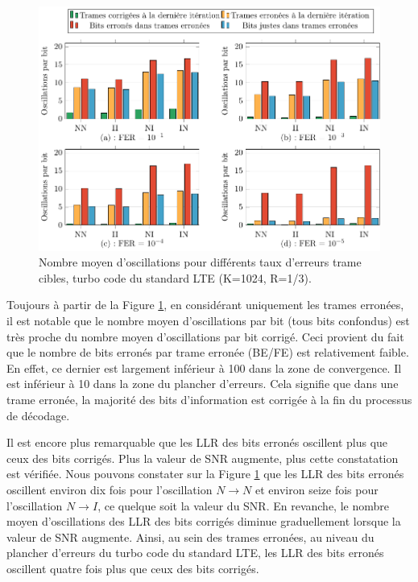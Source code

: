 \begin{figure}[tb]
	\begin{center}
	\includegraphics[width=.9\textwidth]{main/ch2_fig/tikz/m_lte.pdf}
	\caption{Nombre moyen d'oscillations pour différents taux d'erreurs trame cibles, turbo code du standard LTE (K=1024, R=1/3). \label{ch2:fig:meanlte}}
	\end{center}
\end{figure}

Toujours à partir de la Figure \ref{ch2:fig:meanlte}, en considérant uniquement les trames erronées, il est notable que le nombre moyen 
d’oscillations par bit (tous bits confondus) est très proche du nombre moyen d’oscillations par bit corrigé. Ceci 
provient du fait que le nombre de bits erronés par trame erronée (BE/FE) est relativement faible. En effet, ce dernier 
est largement inférieur à 100 dans la zone de convergence. Il est inférieur à 10 dans la zone du plancher d'erreurs. Cela
signifie que dans une trame erronée, la majorité des bits d'information est corrigée à la fin du processus de décodage. 

Il est encore plus remarquable que les LLR des bits erronés oscillent plus que ceux des bits corrigés. Plus la valeur de SNR augmente, 
plus cette constatation est vérifiée. Nous pouvons constater sur la Figure \ref{ch2:fig:meanlte} que les LLR des bits erronés 
oscillent environ dix fois pour l'oscillation $N\rightarrow N$ et environ seize fois pour 
l'oscillation $N\rightarrow I$, ce quelque soit la valeur du SNR. En revanche, le nombre moyen d'oscillations des LLR des bits corrigés 
diminue graduellement lorsque la valeur de SNR augmente. Ainsi, au sein des trames erronées, au niveau du plancher d'erreurs 
du turbo code du standard LTE, les LLR des bits erronés oscillent quatre fois plus que ceux des bits corrigés.

